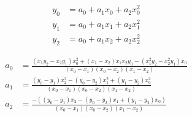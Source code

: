 \begin{align}
  y_0 & = a_0+a_1 x_0+a_2 x_0^{2}  \\
   y_1 & = a_0+a_1 x_1+a_2 x_1^{2}  \\
   y_2 & = a_0+a_1 x_2+a_2 x_2^{2}  
\end{align}

 
\begin{align}
   a_0 & = \frac
{\left(x_1 y_2 - x_2 y_1\right) x_0^{2}+\left(x_1 - x_2\right) x_1 x_2 y_0 -  \left(x_1^{2} y_2 - x_2^{2} y_1\right) x_0}
{\left(x_0 - x_1\right)  \left(x_0 - x_2\right) \left(x_1 - x_2\right)} \\
   a_1 & = \frac
{\left(y_0 - y_1 \right) x_2^{2} - \left(y_0 - y_2\right) x_1^{2}+\left(y_1 - y_2\right) x_0^{2} }
{\left(x_0 - x_1\right) \left(x_0 - x_2\right) \left(x_1 - x_2\right) } \\
   a_2 & = \frac
{ - \left(\left(y_0 - y_1\right) x_2 - \left(y_0 - y_2\right) x_1+ \left(y_1 - y_2\right) x_0\right)}
{\left(x_0 - x_1\right) \left(x_0 - x_2 \right) \left(x_1 - x_2\right)} 
\end{align}
